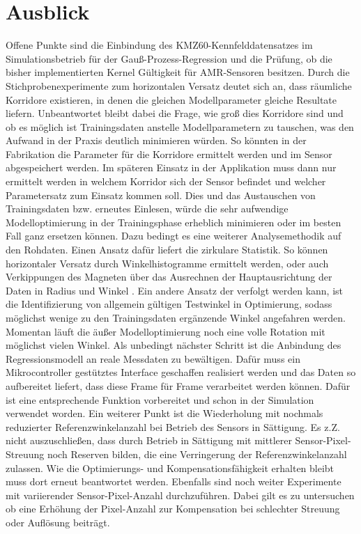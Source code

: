 \section{Ausblick}\label{sec:ausblick}


Offene Punkte sind die Einbindung des KMZ60-Kennfelddatensatzes im Simulationsbetrieb für der Gauß-Prozess-Regression und die Prüfung, ob die bisher implementierten Kernel Gültigkeit für AMR-Sensoren besitzen. Durch die Stichprobenexperimente zum horizontalen Versatz deutet sich an, dass räumliche Korridore existieren, in denen die gleichen Modellparameter gleiche Resultate liefern. Unbeantwortet bleibt dabei die Frage, wie groß dies Korridore sind und ob es möglich ist Trainingsdaten anstelle Modellparametern zu tauschen, was den Aufwand in der Praxis deutlich minimieren würden. So könnten in der Fabrikation die Parameter für die Korridore ermittelt werden und im Sensor abgespeichert werden. Im späteren Einsatz in der Applikation muss dann nur ermittelt werden in welchem Korridor sich der Sensor befindet und welcher Parametersatz zum Einsatz kommen soll. Dies und das Austauschen von Trainingsdaten bzw. erneutes Einlesen, würde die sehr aufwendige Modelloptimierung in der Trainingsphase erheblich minimieren oder im besten Fall ganz ersetzen können. Dazu bedingt es eine weiterer Analysemethodik auf den Rohdaten. Einen Ansatz dafür liefert die zirkulare Statistik. So können horizontaler Versatz durch Winkelhistogramme ermittelt werden, oder auch Verkippungen des Magneten über das Ausrechnen der Hauptausrichtung der Daten in Radius und Winkel \cite{Fisher1993}\cite{Mardia1999}. Ein andere Ansatz der verfolgt werden kann, ist die Identifizierung von allgemein gültigen Testwinkel in Optimierung, sodass möglichst wenige zu den Trainingsdaten ergänzende Winkel angefahren werden. Momentan läuft die äußer Modelloptimierung noch eine volle Rotation mit möglichst vielen Winkel. Als unbedingt nächster Schritt ist die Anbindung des Regressionsmodell an reale Messdaten zu bewältigen. Dafür muss ein Mikrocontroller gestütztes Interface geschaffen realisiert werden und das Daten so aufbereitet liefert, dass diese Frame für Frame verarbeitet werden können. Dafür ist eine entsprechende Funktion vorbereitet und schon in der Simulation verwendet worden. Ein weiterer Punkt ist die Wiederholung mit nochmals reduzierter Referenzwinkelanzahl bei Betrieb des Sensors in Sättigung. Es z.Z. nicht auszuschließen, dass durch Betrieb in Sättigung mit mittlerer Sensor-Pixel-Streuung noch Reserven bilden, die eine Verringerung der Referenzwinkelanzahl zulassen. Wie die Optimierungs- und Kompensationsfähigkeit erhalten bleibt muss dort erneut beantwortet werden. Ebenfalls sind noch weiter Experimente mit variierender Sensor-Pixel-Anzahl durchzuführen. Dabei gilt es zu untersuchen ob eine Erhöhung der Pixel-Anzahl zur Kompensation bei schlechter Streuung oder Auflösung beiträgt.

